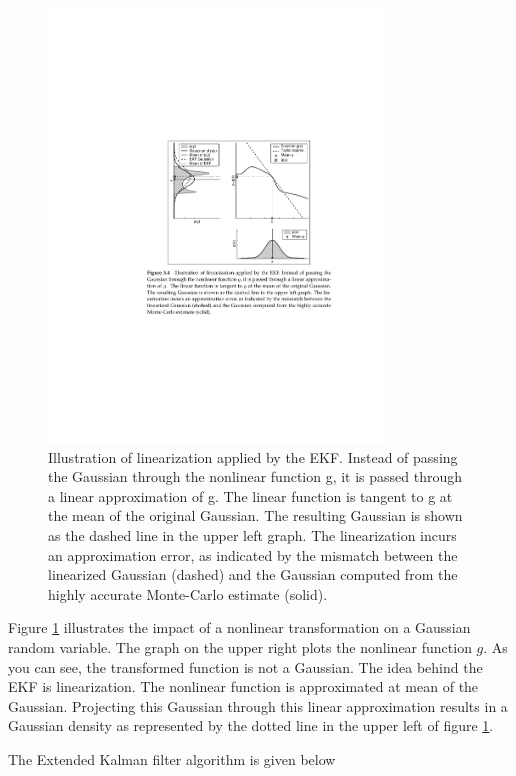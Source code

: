 \documentclass[conference]{IEEEtran}
\begin{document}
\begin{figure}[!t]
\centering
\includegraphics[width=3.5in]{./figures/EkfXform.pdf}
\caption{Illustration of linearization applied by the EKF. Instead of passing the Gaussian through the nonlinear function g, it is passed through a linear approximation of g. The linear function is tangent to g at the mean of the original Gaussian. The resulting Gaussian is shown as the dashed line in the upper left graph. The linearization incurs an approximation error, as indicated by the mismatch between the linearized Gaussian (dashed) and the Gaussian computed from the highly accurate Monte-Carlo estimate (solid).}
\label{EkfXform}
\end{figure}

Figure \ref{EkfXform} illustrates the impact of a nonlinear transformation on a Gaussian random variable. The graph on the upper right plots the nonlinear function $g$. As you can see, the transformed function is not a Gaussian. The idea behind the EKF is linearization. The nonlinear function is approximated at mean of the Gaussian. Projecting this Gaussian through this linear approximation results in a Gaussian density as represented by the dotted line in the upper left of figure \ref{EkfXform}.

The Extended Kalman filter algorithm is given below
\end{document}

